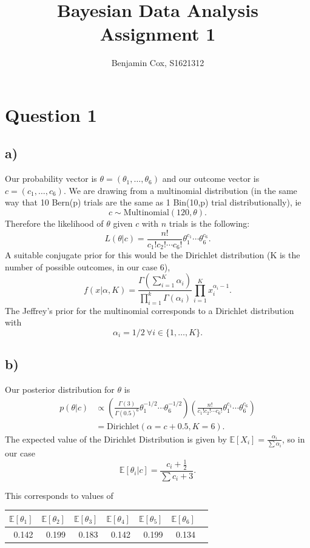 \documentclass[10pt]{extarticle}
\newcommand{\E}{\mathbb{E}}
\begin{document}
	
\title{Bayesian Data Analysis Assignment 1}
\author{Benjamin Cox, S1621312}
\date{\vspace{-5ex}}
\maketitle

\section*{Question 1}

\subsection*{a)}
Our probability vector is $\theta = (\theta_1, \dots, \theta_6)$ and our outcome vector is $c = (c_1, \dots, c_6).$ We are drawing from a multinomial distribution (in the same way that 10 Bern(p) trials are the same as 1 Bin(10,p) trial distributionally), ie $$c \sim \mathrm{Multinomial}(120, \theta).$$ Therefore the likelihood of $\theta$ given $c$ with $n$ trials is the following: $$L(\theta|c) = \frac{n!}{c_1!c_2!\cdots c_6!}\theta_1^{c_1}\cdots\theta_6^{c_6}.$$ A suitable conjugate prior for this would be the Dirichlet distribution (K is the number of possible outcomes, in our case 6), $$f(x| \alpha, K) = \frac{\Gamma(\sum_{i=1}^{K}\alpha_i)}{\prod_{i=1}^{k}\Gamma(\alpha_i)}\prod_{i=1}^{K}x_i^{\alpha_i-1}.$$
The Jeffrey's prior for the multinomial corresponds to a Dirichlet distribution with $$\alpha_i = 1/2\  \forall i\in \{1,\dots,K\}.$$

\subsection*{b)}
Our posterior distribution for $\theta$ is 
\begin{align*}
p(\theta|c) &\propto \left(\frac{\Gamma(3)}{\Gamma(0.5)^6}\theta_1^{-1/2}\cdots\theta_6^{-1/2}\right)\left(\frac{n!}{c_1!c_2!\cdots c_6!}\theta_1^{c_1}\cdots\theta_6^{c_6}\right)\\
&= \mathrm{Dirichlet}\left(\alpha = c+0.5, K = 6\right).
\end{align*}
The expected value of the Dirichlet Distribution is given by $\E\left[X_i\right] = \frac{\alpha_i}{\sum\alpha_i}$, so in our case $$\E\left[\theta_i|c\right] = \frac{c_i+\frac{1}{2}}{\sum c_i + 3}.$$

This corresponds to values of 
\begin{table}[H]
	\centering
	\begin{tabular}{rrrrrrr}
		\hline
		$\E\left[\theta_1\right]$ & $\E\left[\theta_2\right]$ & $\E\left[\theta_3\right]$ & $\E\left[\theta_4\right]$ & $\E\left[\theta_5\right]$ & $\E\left[\theta_6\right]$ \\ 
		\hline
		0.142 & 0.199 & 0.183 & 0.142 & 0.199 & 0.134 \\ 
		\hline
	\end{tabular}
\end{table}
\end{document}
